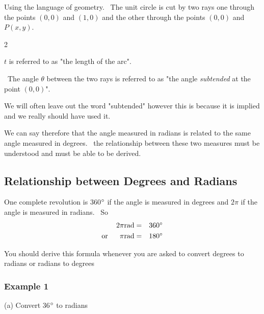 Using the language of geometry. \ The
unit circle is cut by two rays one through the points $\left (0 ,0\right )$ and $\left (1 ,0\right )$ and the other through the points $\left (0 ,0\right )$ and $P \left (x ,y\right )$.  
\columnsep =30pt
\begin {multicols}{2}
 

   
\setlength\fboxrule{0in}\setlength\fboxsep{0.2in}


$t$ is referred to as "the length of the arc".\vspace{1cm} 

\ The
angle $\theta $ between the two rays is referred to as "the angle \emph{subtended} at the point $\left (0 ,0\right )$". 

We will often leave out the word "subtended"
however this is because it is implied and we really should have used it. 


\end {multicols}


We can say therefore that the angle measured in radians is related to the same angle measured in degrees. \ the
relationship between these two measures must be understood and must be able to be derived. 

\subsection{Relationship between Degrees and Radians}
One complete revolution is 360$\mbox{{\ensuremath{{}^\circ}}}$ if the angle is measured in degrees and $2 \pi $ if the angle is measured in radians. \ So
\begin{align*}2 \pi \text{}\mbox{rad} &  = & 360 \mbox{{\ensuremath{{}^\circ}}} \\
\text{or\ \ \ \ \ }\pi \text{}\mbox{rad} &  = & 180 \mbox{{\ensuremath{{}^\circ}}}\end{align*}

You should derive this formula whenever you are asked to convert degrees to radians or radians
to degrees 

\subsubsection{Example 1}
(a) Convert 36$\mbox{{\ensuremath{{}^\circ}}}$ to radians 

